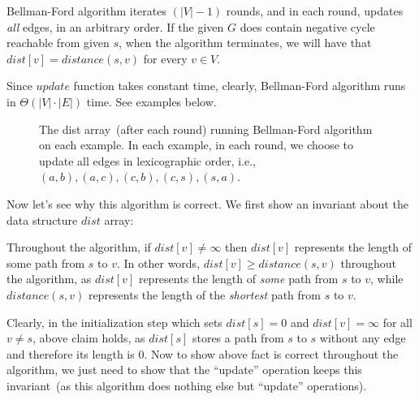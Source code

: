 Bellman-Ford algorithm iterates $(|V| - 1)$ rounds, and in each round, updates \emph{all} edges, in an arbitrary order.
If the given $G$ does contain negative cycle reachable from given $s$,
when the algorithm terminates, we will have that $dist[v] = distance(s,v)$ for every $v\in V$. 

\begin{minipage}{0.8\textwidth}
	\xxx
	\xxx
	\xxx
	\xxx
	\xxx
	\xxx
	\xxx
	\xxx
	\xxx
\end{minipage}

Since $update$ function takes constant time, clearly, Bellman-Ford algorithm runs in $\Theta(|V| \cdot |E|)$ time.
See examples below.

\begin{figure}[h]
\centering{}
\caption{The dist array~(after each round) running Bellman-Ford algorithm on each example.
In each example, in each round, we choose to update all edges in lexicographic order, i.e., $(a,b), (a,c), (c,b),(c,s),(s,a)$.}
\end{figure}


Now let's see why this algorithm is correct. We first show an invariant about the data structure $dist$ array: 

\begin{fact}
\label{bf-fact1}
Throughout the algorithm, if $dist[v] \neq \infty$ then $dist[v]$ represents the length of some path from $s$ to $v$.
In other words, $dist[v] \ge distance(s,v)$ throughout the algorithm, as $dist[v]$ 
represents the length of \emph{some} path from $s$ to $v$, while $distance(s,v)$ represents the
length of the \emph{shortest} path from $s$ to $v$.
\end{fact}

Clearly, in the initialization step which sets $dist[s] = 0$ and $dist[v] = \infty$ for all $v\neq s$, above claim holds,
as $dist[s]$ stores a path from $s$ to $s$ without any edge and therefore its length is 0.
Now to show above fact is correct throughout the algorithm, we just need to show that the ``update'' operation keeps
this invariant~(as this algorithm does nothing else but ``update'' operations).

